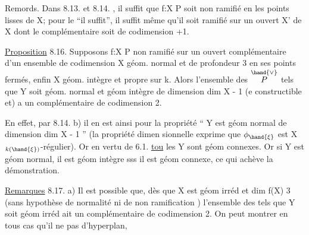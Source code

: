 

Remords. Dans 8.13. et 8.14. , il suffit  que f:X\hand{$\to$} P soit non
ramifié en les points lisses de X; pour le ``il suffit'', il suffit même
qu'il soit  ramifié sur un ouvert X' de X dont le complémentaire soit
de codimension \hand{$\geqslant$} +1.

\uline{Proposition} 8.16. Supposons f:X\hand{$\to$} P non ramifié sur un ouvert
complémentaire d'un ensemble de codimension  X géom. normal et
de profondeur\hand{$\geqslant$} 3 en ses points fermés, enfin X géom. intègre et propre
sur k. Alors l'ensemble des \hand{$\xi \in$} $\overset{\hand{\vee}}{P}$ tels que 
Y\hand{$_\xi$} soit géom. normal et géom intègre de dimension dim X - 1 (e
constructible et) a un complémentaire de codimension \hand{$\geqslant$} 2.

En effet, par 8.14. b) il en est ainsi pour la propriété
`` Y\hand{$_\xi$} est géom normal de dimension dim X - 1 '' (la propriété dimen
sionnelle exprime que $\phi_{\hand{\xi}}$ est X$_{k(\hand{\xi})}$-régulier). Or en vertu de 6.1.
\uline{tou} les Y\hand{$_\xi$} sont géom connexes. Or si Y\hand{$_\xi$} est géom normal, il est
géom intègre sss il est géom connexe, ce qui achève la démonstration.

\uline{Remarques} 8.17. a)  Il est possible que, dès que X est géom irréd
et dim f(X) \hand{$\geqslant$} 3 (sans hypothèse de normalité ni de non ramification )
l'ensemble des \hand{$\xi$} tels que Y\hand{$_\xi$} soit géom irréd ait un complémentaire
de codimension \hand{$\geqslant$}2. On peut montrer en tous cas qu'il ne pas
d'hyperplan, 


